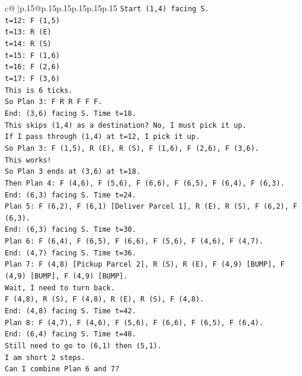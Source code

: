 \documentclass{article}
\begin{document}
{\begin{supertabular}{c@{$\;$}|p{.15\linewidth}@{}p{.15\linewidth}p{.15\linewidth}p{.15\linewidth}p{.15\linewidth}p{.15\linewidth}}
{{{\texttt{Start (1,4) facing S.} \\
\texttt{t=12: F (1,5)} \\
\texttt{t=13: R (E)} \\
\texttt{t=14: R (S)} \\
\texttt{t=15: F (1,6)} \\
\texttt{t=16: F (2,6)} \\
\texttt{t=17: F (3,6)} \\
\texttt{This is 6 ticks.} \\
\texttt{So Plan 3: F R R F F F.} \\
\texttt{End: (3,6) facing S. Time t=18.} \\
\texttt{This skips (1,4) as a destination? No, I must pick it up.} \\
\texttt{If I pass through (1,4) at t=12, I pick it up.} \\
\texttt{So Plan 3: F (1,5), R (E), R (S), F (1,6), F (2,6), F (3,6).} \\
\texttt{This works!} \\
\texttt{So Plan 3 ends at (3,6) at t=18.} \\
\texttt{Then Plan 4: F (4,6), F (5,6), F (6,6), F (6,5), F (6,4), F (6,3).} \\
\texttt{End: (6,3) facing S. Time t=24.} \\
\texttt{Plan 5: F (6,2), F (6,1) {[}Deliver Parcel 1{]}, R (E), R (S), F (6,2), F (6,3).} \\
\texttt{End: (6,3) facing S. Time t=30.} \\
\texttt{Plan 6: F (6,4), F (6,5), F (6,6), F (5,6), F (4,6), F (4,7).} \\
\texttt{End: (4,7) facing S. Time t=36.} \\
\texttt{Plan 7: F (4,8) {[}Pickup Parcel 2{]}, R (S), R (E), F (4,9) {[}BUMP{]}, F (4,9) {[}BUMP{]}, F (4,9) {[}BUMP{]}.} \\
\texttt{Wait, I need to turn back.} \\
\texttt{F (4,8), R (S), F (4,8), R (E), R (S), F (4,8).} \\
\texttt{End: (4,8) facing S. Time t=42.} \\
\texttt{Plan 8: F (4,7), F (4,6), F (5,6), F (6,6), F (6,5), F (6,4).} \\
\texttt{End: (6,4) facing S. Time t=48.} \\
\texttt{Still need to go to (6,1) then (5,1).} \\
\texttt{I am short 2 steps.} \\
\texttt{Can I combine Plan 6 and 7?} \\
}}}
\end{supertabular}}
\end{document}
